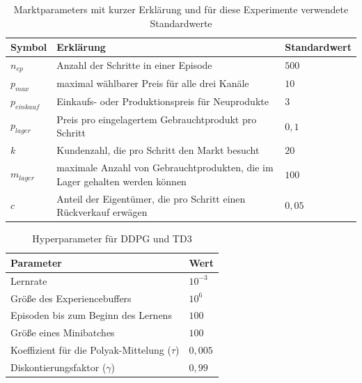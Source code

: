 \begin{table}[htb]
	\centering
	\begin{tabular}{p{} p{} p{}}
		\toprule
		Symbol        & Erklärung                                                                   & Standardwert\\\midrule
		$n_{ep}$      & Anzahl der Schritte in einer Episode                                        & $500$\\
		$p_{max}$     & maximal wählbarer Preis für alle drei Kanäle                                & $10$\\
		$p_{einkauf}$ & Einkaufs- oder Produktionspreis für Neuprodukte                             & $3$\\
		$p_{lager}$   & Preis pro eingelagertem Gebrauchtprodukt pro Schritt                        & $0{,}1$\\
		$k$           & Kundenzahl, die pro Schritt den Markt besucht                               & $20$\\
		$m_{lager}$   & maximale Anzahl von Gebrauchtprodukten, die im Lager gehalten werden können & $100$\\
		$c$           & Anteil der Eigentümer, die pro Schritt einen Rückverkauf erwägen            & $0{,}05$\\\bottomrule
	\end{tabular}
	\caption{Marktparameters mit kurzer Erklärung und für diese Experimente verwendete Standardwerte}
	\label{tab:default_parameters}
\end{table}

\begin{table}[htb]
	\centering
	\begin{tabular}{p{} p{}}
		\toprule
		Parameter                                     & Wert\\\midrule
		Lernrate                                      & $10^{-3}$\\
		Größe des Experiencebuffers                   & $10^6$\\
		Episoden bis zum Beginn des Lernens           & $100$\\
		Größe eines Minibatches                       & $100$\\
		Koeffizient für die Polyak-Mittelung ($\tau$) & $0{,}005$\\
		Diskontierungsfaktor ($\gamma$)               & $0{,}99$\\\bottomrule
	\end{tabular}
	\caption{Hyperparameter für DDPG und TD3}
	\label{tab:DDPGHyperparameters}
\end{table}

